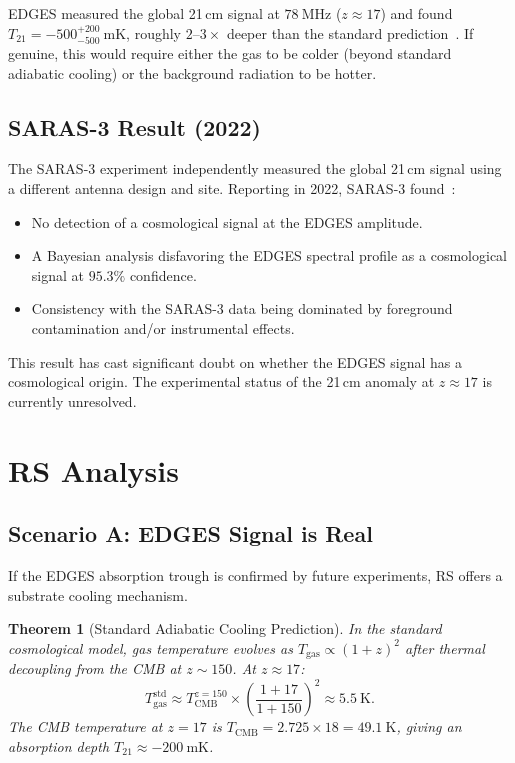 \documentclass[12pt,a4paper]{article}
\newtheorem{theorem}{Theorem}[section]
\theoremstyle{definition}
\theoremstyle{remark}
\begin{document}
EDGES measured the global 21\,cm signal at $78~\mathrm{MHz}$
($z \approx 17$) and found $T_{21} = -500^{+200}_{-500}~\mathrm{mK}$,
roughly $2$--$3\times$ deeper than the standard prediction~\cite{EDGES}.
If genuine, this would require either the gas to be colder (beyond
standard adiabatic cooling) or the background radiation to be hotter.

\subsection{SARAS-3 Result (2022)}

The SARAS-3 experiment independently measured the global 21\,cm signal
using a different antenna design and site.  Reporting in 2022,
SARAS-3 found~\cite{SARAS3}:
\begin{itemize}[nosep]
  \item No detection of a cosmological signal at the EDGES amplitude.
  \item A Bayesian analysis disfavoring the EDGES spectral profile as
  a cosmological signal at $95.3\%$ confidence.
  \item Consistency with the SARAS-3 data being dominated by
  foreground contamination and/or instrumental effects.
\end{itemize}

This result has cast significant doubt on whether the EDGES signal
has a cosmological origin.  The experimental status of the 21\,cm
anomaly at $z \approx 17$ is currently unresolved.

\section{RS Analysis}
\label{sec:analysis}

\subsection{Scenario A: EDGES Signal is Real}

If the EDGES absorption trough is confirmed by future experiments, RS
offers a substrate cooling mechanism.

\begin{theorem}[Standard Adiabatic Cooling Prediction]
\label{thm:adiabatic}
In the standard cosmological model, gas temperature evolves as
$T_{\mathrm{gas}} \propto (1+z)^2$ after thermal decoupling from the
CMB at $z \sim 150$.  At $z \approx 17$:
\begin{equation}
  T_{\mathrm{gas}}^{\mathrm{std}} \approx T_{\mathrm{CMB}}^{z=150}
  \times \left(\frac{1+17}{1+150}\right)^2 \approx 5.5~\mathrm{K}.
\end{equation}
The CMB temperature at $z = 17$ is $T_{\mathrm{CMB}} = 2.725 \times 18
= 49.1~\mathrm{K}$, giving an absorption depth $T_{21} \approx
-200~\mathrm{mK}$.
\end{theorem}
\end{document}
